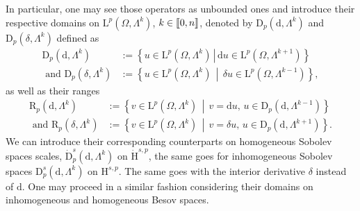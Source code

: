 \documentclass[AHL,Unicode,longabstracts,published]{cedram}
\newcommand{\rmH}{\mathrm{H}}%
\newcommand{\rmd}{\mathrm{d}}
\newcommand{\rmD}{\mathrm{D}}
\newcommand{\rmL}{\mathrm{L}}
\newcommand{\rmR}{\mathrm{R}}
\newcommand{\llbracket}{\mathopen{[\mkern -2.7mu[}}
\newcommand{\rrbracket}{\mathclose{]\mkern -2.7mu]}}
\newcommand{\llb}{\llbracket}
\newcommand{\rrb}{\rrbracket}
\begin{document}
\pagebreak
In particular, one may see those operators as unbounded ones and introduce their respective domains on $\rmL^p(\Omega, \Lambda^{k})$, $k\in\llb 0,n\rrb$, denoted by $\rmD_p(\rmd,\Lambda^k)$ and $\rmD_p({\delta},\Lambda^k)$ defined as
\begin{align*}
\rmD_{p}\left(\rmd,\Lambda^k\right)&:=\left\{u \in \rmL^p\left(\Omega,\Lambda^k\right) \,\left|\, \rmd u \in \rmL^p\left(\Omega,\Lambda^{k+1}\right)\right.\right\}\\
\text { and } \rmD_{p}\left({\delta},\Lambda^k\right)&:=\left\{u \in \rmL^p\left(\Omega, \Lambda^k\right)\,\middle|\, {\delta} u \in \rmL^p\left(\Omega, \Lambda^{k-1}\right)\right\},
\end{align*}
as well as their ranges
\begin{align*}
\rmR _{p}\left(\rmd,\Lambda^k\right)&:=\left\{v \in \rmL^p\left(\Omega,\Lambda^k\right) \,\middle|\, v=\rmd u,\, u\in \rmD_{p}\left(\rmd,\Lambda^{k-1}\right)\right\}\\
\text { and } \rmR _{p}\left({\delta},\Lambda^k\right)&:=\left\{ v \in \rmL^p\left(\Omega,\Lambda^k\right) \,\middle|\,v=\delta u,\, u\in \rmD_{p}\left(\rmd,\Lambda^{k+1}\right)\right\}.
\end{align*}
We can introduce their corresponding counterparts on homogeneous Sobolev spaces scales, $\dot{\rmD}^{s}_{p}(\rmd,\Lambda^k)$ on $\dot{\rmH}^{s,p}$, the same goes for inhomogeneous Sobolev spaces ${\rmD}^{s}_{p}(\rmd,\Lambda^k)$ on ${\rmH}^{s,p}$. The same goes with the interior derivative ${\delta}$ instead of $\rmd$. One may proceed in a similar fashion considering their domains on inhomogeneous and homogeneous Besov spaces.
\end{document}

